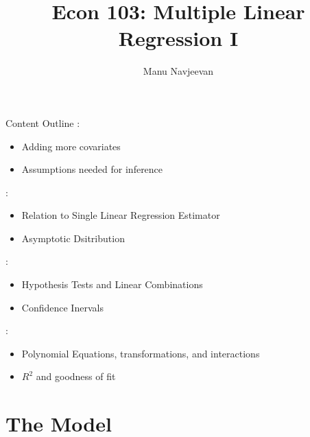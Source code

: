 \documentclass[notheorems,9pt, handout]{beamer}
\title{Econ 103: Multiple Linear Regression I}
\author{Manu Navjeevan}
\institute{UCLA}
\begin{document}
\frame{\titlepage}

\begin{frame}{Content Outline} 
	\label{frame:content-outline}
	:
	\begin{itemize}
		\item Adding more covariates
		\item Assumptions needed for inference
	\end{itemize}
	:
	\begin{itemize}
		\item Relation to Single Linear Regression Estimator
		\item Asymptotic Dsitribution
	\end{itemize}
	:
	\begin{itemize}
		\item Hypothesis Tests and Linear Combinations
		\item Confidence Inervals
	\end{itemize}
	:
	\begin{itemize}
		\item Polynomial Equations, transformations, and interactions
		\item \(R^2\) and goodness of fit
	\end{itemize}
\end{frame}
\section{The Model}
\end{document}

